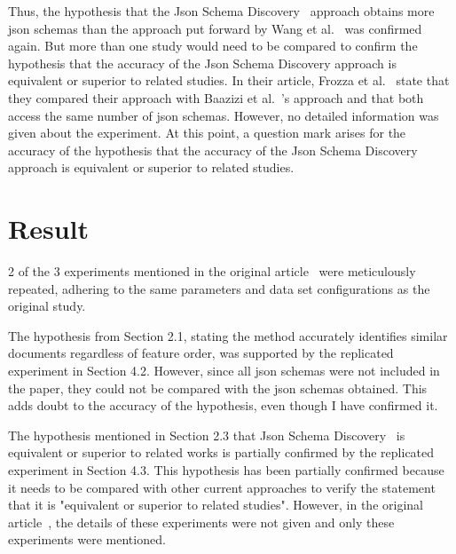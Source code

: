 \documentclass[sigconf, nonacm]{acmart}
\begin{document}
Thus, the hypothesis that the Json Schema Discovery~\cite{JSONSchemaDiscovery} approach obtains more json schemas than the approach put forward by Wang et al.~\cite{Wang2015SchemaManagement} was confirmed again. But more than one study would need to be compared to confirm the hypothesis that the accuracy of the Json Schema Discovery approach is equivalent or superior to related studies. In their article, Frozza et al.~\cite{SchemaExtraction} state that they compared their approach with Baazizi et al.~\cite{Baazizi2017SchemaInference}'s approach and that both access the same number of json schemas. However, no detailed information was given about the experiment. At this point, a question mark arises for the accuracy of the hypothesis that the accuracy of the Json Schema Discovery~\cite{JSONSchemaDiscovery} approach is equivalent or superior to related studies.

\section{Result}
2 of the 3 experiments mentioned in the original article~\cite{SchemaExtraction} were meticulously repeated, adhering to the same parameters and data set configurations as the original study.

The hypothesis from Section 2.1, stating the method accurately identifies similar documents regardless of feature order, was supported by the replicated experiment in Section 4.2. However, since all json schemas were not included in the paper, they could not be compared with the json schemas obtained. This adds doubt to the accuracy of the hypothesis, even though I have confirmed it.

The hypothesis mentioned in Section 2.3 that Json Schema Discovery~\cite{JSONSchemaDiscovery} is equivalent or superior to related works is partially confirmed by the replicated experiment in Section 4.3. This hypothesis has been partially confirmed because it needs to be compared with other current approaches to verify the statement that it is "equivalent or superior to related studies". However, in the original article~\cite{SchemaExtraction}, the details of these experiments were not given and only these experiments were mentioned.




\end{document}
